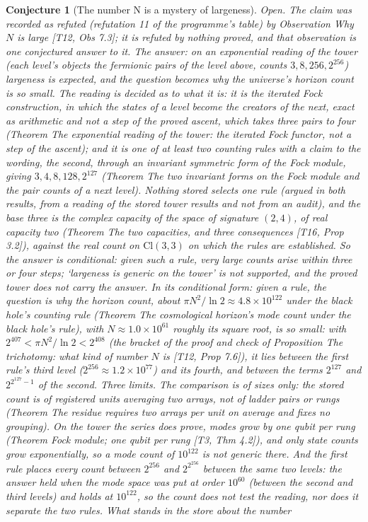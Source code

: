 \documentclass[11pt]{article}
\newtheorem{conjecture}[theorem]{Conjecture}
\theoremstyle{definition}
\theoremstyle{plain}
\newcommand{\changedmark}[2]{\marginpar{\raggedright\scriptsize\color{#1}#2}}
\providecommand{\Cl}{}\renewcommand{\Cl}{\mathrm{Cl}}
\begin{document}
\begin{conjecture}[The number N is a mystery of largeness]\label{c:refuted.the-number-n-is-a-mystery-of-largeness}
\changedmark{BurntOrange}{changed since the deposit}
Open. The claim was recorded as refuted (refutation 11 of the programme's table) by Observation \emph{Why $N$ is large} [T12, Obs 7.3]; it is refuted by nothing proved, and that observation is one conjectured answer to it. The answer: on an exponential reading of the tower (each level's objects the fermionic pairs of the level above, counts $3, 8, 256, 2^{256}$) largeness is expected, and the question becomes why the universe's horizon count is so small. The reading is decided as to what it is: it is the iterated Fock construction, in which the states of a level become the creators of the next, exact as arithmetic and not a step of the proved ascent, which takes three pairs to four (Theorem \emph{The exponential reading of the tower: the iterated Fock functor, not a step of the ascent}); and it is one of at least two counting rules with a claim to the wording, the second, through an invariant symmetric form of the Fock module, giving $3, 4, 8, 128, 2^{127}$ (Theorem \emph{The two invariant forms on the Fock module and the pair counts of a next level}). Nothing stored selects one rule (argued in both results, from a reading of the stored tower results and not from an audit), and the base three is the complex capacity of the space of signature $(2,4)$, of real capacity two (Theorem \emph{The two capacities, and three consequences} [T16, Prop 3.2]), against the real count on $\Cl(3,3)$ on which the rules are established. So the answer is conditional: given such a rule, very large counts arise within three or four steps; `largeness is generic on the tower' is not supported, and the proved tower does not carry the answer. In its conditional form: given a rule, the question is why the horizon count, about $\pi N^{2}/\ln 2 \approx 4.8 \times 10^{122}$ under the black hole's counting rule (Theorem \emph{The cosmological horizon's mode count under the black hole's rule}), with $N \approx 1.0 \times 10^{61}$ roughly its square root, is so small: with $2^{407} < \pi N^{2}/\ln 2 < 2^{408}$ (the bracket of the proof and check of Proposition \emph{The trichotomy: what kind of number $N$ is} [T12, Prop 7.6]), it lies between the first rule's third level ($2^{256} \approx 1.2 \times 10^{77}$) and its fourth, and between the terms $2^{127}$ and $2^{2^{127}-1}$ of the second. Three limits. The comparison is of sizes only: the stored count is of registered units averaging two arrays, not of ladder pairs or rungs (Theorem \emph{The residue requires two arrays per unit on average and fixes no grouping}). On the tower the series does prove, modes grow by one qubit per rung (Theorem \emph{Fock module; one qubit per rung} [T3, Thm 4.2]), and only state counts grow exponentially, so a mode count of $10^{122}$ is not generic there. And the first rule places every count between $2^{256}$ and $2^{2^{256}}$ between the same two levels: the answer held when the mode space was put at order $10^{60}$ (between the second and third levels) and holds at $10^{122}$, so the count does not test the reading, nor does it separate the two rules. What stands in the store about the number 
\end{conjecture}
\end{document}
